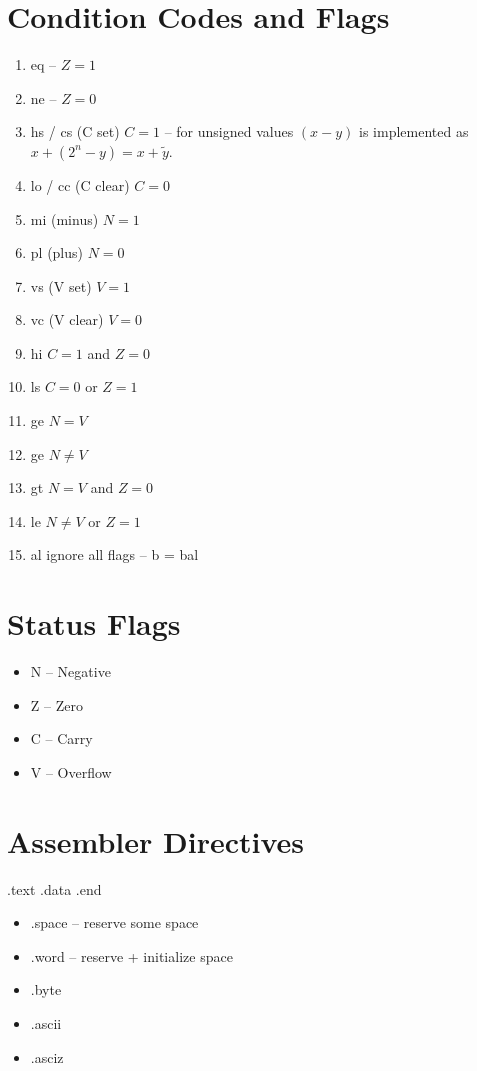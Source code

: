 \documentclass{scrartcl}
\begin{document}
\section{Condition Codes and Flags}
\begin{enumerate}
	\setcounter{enumi}{0}
	\item eq -- $Z = 1$
	\item ne -- $Z = 0$
	\item hs / cs (C set) $C = 1$ -- for unsigned values $(x - y)$ is implemented as $x + (2^n - y) = x + \tilde y$.
	\item lo / cc (C clear) $C = 0$
	\item mi (minus) $N = 1$
	\item pl (plus) $N = 0$
	\item vs (V set) $V = 1$
	\item vc (V clear) $V = 0$
	\item hi $C = 1$ and $Z = 0$
	\item ls $C = 0$ or $Z = 1$
	\item ge $N = V$
	\item ge $N \neq V$
	\item gt $N = V$ and $Z = 0$
	\item le $N \neq V$ or $Z = 1$
	\item al ignore all flags -- b = bal
\end{enumerate}

\section{Status Flags}
\begin{itemize}
	\item N -- Negative
	\item Z -- Zero
	\item C -- Carry
	\item V -- Overflow
\end{itemize}

\section{Assembler Directives}
.text
.data
.end

\begin{itemize}
\item .space -- reserve some space
\item .word -- reserve + initialize space
\item .byte
\item .ascii
\item .asciz
\end{itemize}
\end{document}
